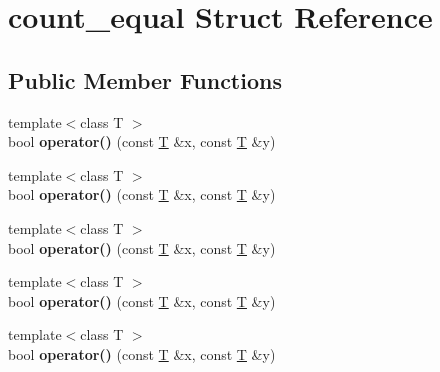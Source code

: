 \hypertarget{structcount__equal}{}\section{count\+\_\+equal Struct Reference}
\label{structcount__equal}
\subsection*{Public Member Functions}
\begin{DoxyCompactItemize}
\item 
\mbox{\label{structcount__equal_a292cd821e08349355a9edbfa6c2f5554}} 
{\footnotesize template$<$class T $>$ }\\bool {\bfseries operator()} (const \mbox{\hyperlink{struct_t}{T}} \&x, const \mbox{\hyperlink{struct_t}{T}} \&y)
\item 
\mbox{\label{structcount__equal_a292cd821e08349355a9edbfa6c2f5554}} 
{\footnotesize template$<$class T $>$ }\\bool {\bfseries operator()} (const \mbox{\hyperlink{struct_t}{T}} \&x, const \mbox{\hyperlink{struct_t}{T}} \&y)
\item 
\mbox{\label{structcount__equal_a292cd821e08349355a9edbfa6c2f5554}} 
{\footnotesize template$<$class T $>$ }\\bool {\bfseries operator()} (const \mbox{\hyperlink{struct_t}{T}} \&x, const \mbox{\hyperlink{struct_t}{T}} \&y)
\item 
\mbox{\label{structcount__equal_a292cd821e08349355a9edbfa6c2f5554}} 
{\footnotesize template$<$class T $>$ }\\bool {\bfseries operator()} (const \mbox{\hyperlink{struct_t}{T}} \&x, const \mbox{\hyperlink{struct_t}{T}} \&y)
\item 
\mbox{\label{structcount__equal_a292cd821e08349355a9edbfa6c2f5554}} 
{\footnotesize template$<$class T $>$ }\\bool {\bfseries operator()} (const \mbox{\hyperlink{struct_t}{T}} \&x, const \mbox{\hyperlink{struct_t}{T}} \&y)
\item 
\mbox{\label{structcount__equal_af3e22fbfee92a5e2854cd3fee9dbf7ef}} 

\end{DoxyCompactItemize}
